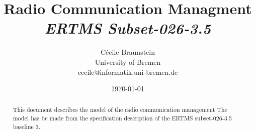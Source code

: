 \documentclass[11pt,notitlepage]{article}
\title{Radio Communication Managment \\
    {\it ERTMS Subset-026-3.5}}
\author{C{\'e}cile Braunstein\\University of Bremen\\
cecile@informatik.uni-bremen.de}
\date{\today}                                           %
\begin{document}
\maketitle

\begin{abstract}
This document describes the model of the radio communication management The
model has be made from the specification description of the ERTMS subset-026-3.5
baseline 3.
\end{abstract}


\end{document}
